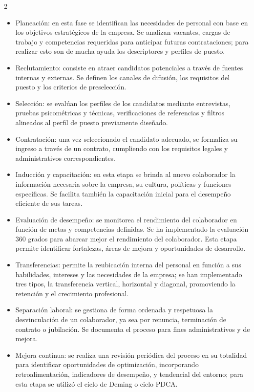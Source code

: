 \documentclass[12pt,spanish,Letterpaper,openany]{book}
\begin{document}
\begin {multicols}{2}
\begin{itemize}
\item
  Planeación: en esta fase se identifican las necesidades de personal con base en los objetivos estratégicos de la empresa. Se analizan vacantes, cargas de trabajo y competencias requeridas para anticipar futuras contrataciones; para realizar esto son de mucha ayuda los descriptores y perfiles de puesto.
\item
  Reclutamiento: consiste en atraer candidatos potenciales a través de fuentes internas y externas. Se definen los canales de difusión, los requisitos del puesto y los criterios de preselección.
\item
  Selección: se evalúan los perfiles de los candidatos mediante entrevistas, pruebas psicométricas y técnicas, verificaciones de referencias y filtros alineados al perfil de puesto previamente diseñado.
\item
  Contratación: una vez seleccionado el candidato adecuado, se formaliza su ingreso a través de un contrato, cumpliendo con los requisitos legales y administrativos correspondientes.
\item
  Inducción y capacitación: en esta etapa se brinda al nuevo colaborador la información necesaria sobre la empresa, su cultura, políticas y funciones específicas. Se facilita también la capacitación inicial para el desempeño eficiente de sus tareas.
\item
  Evaluación de desempeño: se monitorea el rendimiento del colaborador en función de metas y competencias definidas. Se ha implementado la evaluación 360 grados para abarcar mejor el rendimiento del colaborador. Esta etapa permite identificar fortalezas, áreas de mejora y oportunidades de desarrollo.
\item
  Transferencias: permite la reubicación interna del personal en función a sus habilidades, intereses y las necesidades de la empresa; se han implementado tres tipos, la transferencia vertical, horizontal y diagonal, promoviendo la retención y el crecimiento profesional.
\item
  Separación laboral: se gestiona de forma ordenada y respetuosa la desvinculación de un colaborador, ya sea por renuncia, terminación de contrato o jubilación. Se documenta el proceso para fines administrativos y de mejora.
\item
  Mejora continua: se realiza una revisión periódica del proceso en su totalidad para identificar oportunidades de optimización, incorporando retroalimentación, indicadores de desempeño, y tendencial del entorno; para esta etapa se utilizó el ciclo de Deming o ciclo PDCA.
\end{itemize}


\end{multicols}
\end{document}
